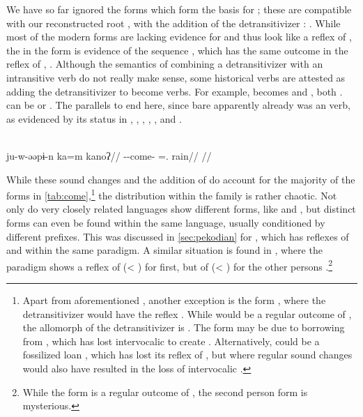 We have so far ignored the forms which form the basis for  ; these are compatible with our reconstructed root , with the addition of the detransitivizer : .
While most of the modern forms are lacking evidence for  and thus look like a reflex of , the  in the \akawaio form  is evidence of the sequence , which has the same outcome  in the \macushi reflex of , .
Although the semantics of combining a detransitivizer with an intransitive verb do not really make sense, some historical  verbs are attested as adding the detransitivizer to become  verbs.
For example,    becomes \trio {} \parencite[252]{triomeira1999} and \kalina {} \parencite[429]{courtz2008carib}, both .
\waiwai {} can be  \parencite[30]{waiwaihawkins1998} or  \parencite[204]{hawkins1953waiwai}.
The parallels to  end here, since bare   apparently already was an  verb, as evidenced by its status in \kaxui, \kalina, \panare {}, \arara, \trio, and \akuriyo.

\panare \parencite[][65]{panarepayne2013}\\
\begingl
\gla ju-w-əəpɨ-n ka=m kanoʔ//
\glb {}--come- =. rain//
\glft {}//
\endgl
\xe

While these sound changes and the addition of  do account for the majority of the forms in \cref{tab:come},\footnote{
Apart from aforementioned \akuriyo {}, another exception is the \apalai form , where the detransitivizer would have the reflex  \parencite[506]{meira2010origin}.
While  would be a regular outcome of , the  allomorph of the detransitivizer is .
The form may be due to borrowing from \trio, which has lost intervocalic  to create .
Alternatively, \apalai {} could be a fossilized loan \wayana, which has lost its reflex of , but where regular sound changes would also have resulted in the loss of intervocalic  \parencite[63]{wayanatavares2005}.}
the distribution within the family is rather chaotic.
Not only do very closely related languages show different forms, like \yawarana and \mapoyo, but distinct forms can even be found within the same language, usually conditioned by different prefixes.
This was discussed in \cref{sec:pekodian} for \arara, which has reflexes of  and  within the same paradigm.
A similar situation is found in \trio, where the \setone paradigm shows a reflex of  (< ) for first, but of  (< ) for the other persons .\footnote{While the  form is a regular outcome of , the second person form is mysterious.}

